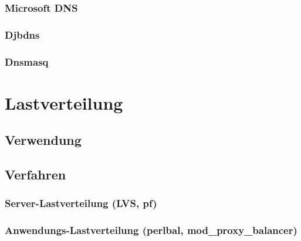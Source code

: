 \documentclass[a4paper, 11pt, toc=bibliography, toc=listof]{scrbook}
\begin{document}

				\subsubsection{Microsoft DNS} %
				\label{ssub:Microsoft DNS}
				

				\subsubsection{Djbdns} %
				\label{ssub:Djbdns}
				

				\subsubsection{Dnsmasq} %
				\label{ssub:Dnsmasq}
				


			

		\section{Lastverteilung} %
		\label{sec:Lastverteilung}
	
			\subsection{Verwendung} %
			\label{sub:Verwendung}
			

			\subsection{Verfahren} %
			\label{sub:Verfahren}

				\subsubsection{Server-Lastverteilung (LVS, pf)} %
				\label{ssub:Server Lastverteilung (LVS, pf)}
				

				\subsubsection{Anwendungs-Lastverteilung (perlbal, mod\_proxy\_balancer)} %
				\label{ssub:Anwendungs-Lastverteilung}
				
\end{document}
